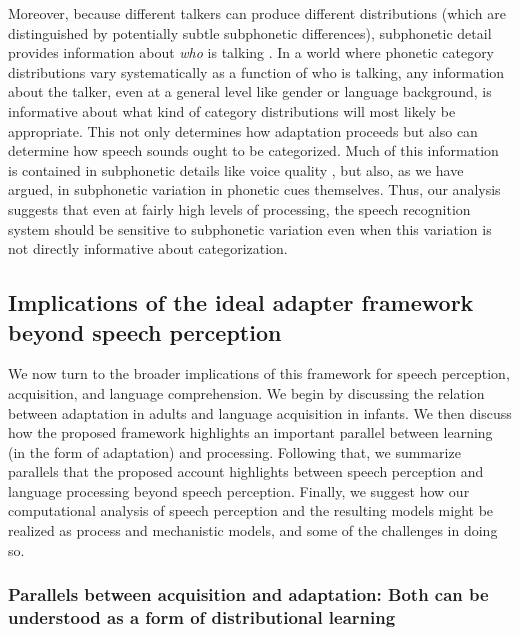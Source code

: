 Moreover, because different talkers can produce different distributions (which are distinguished by potentially subtle subphonetic differences), subphonetic detail provides information about \emph{who} is talking \autocite{Creel2011,Pardo2006}.  In a world where phonetic category distributions vary systematically as a function of who is talking, any information about the talker, even at a general level like gender or language background, is informative about what kind of category distributions will most likely be appropriate.  This not only determines how adaptation proceeds but also can determine how speech sounds ought to be categorized.  Much of this information is contained in subphonetic details like voice quality \autocite{Pardo2006}, but also, as we have argued, in subphonetic variation in phonetic cues themselves.  Thus, our analysis suggests that even at fairly high levels of processing, the speech recognition system should be sensitive to subphonetic variation even when this variation is not directly informative about categorization.

\label{r3-epi-abs-end}
\label{r1-epi-abs-end}

\subsection{Implications of the ideal adapter framework beyond speech perception}
\label{sec:general-discussion}

We now turn to the broader implications of this framework for speech perception, acquisition, and language comprehension. We begin by discussing the relation between adaptation in adults and language acquisition in infants. We then discuss how the proposed framework highlights an important parallel between learning (in the form of adaptation) and processing. Following that, we summarize parallels that the proposed account highlights between speech perception and language processing beyond speech perception.
Finally, we suggest how our computational analysis of speech perception and the resulting models might be realized as process and mechanistic models, and some of the challenges in doing so.

\subsubsection{Parallels between acquisition and adaptation: Both can be understood as a form of distributional learning}
\label{sec:parall-betw-proc}

